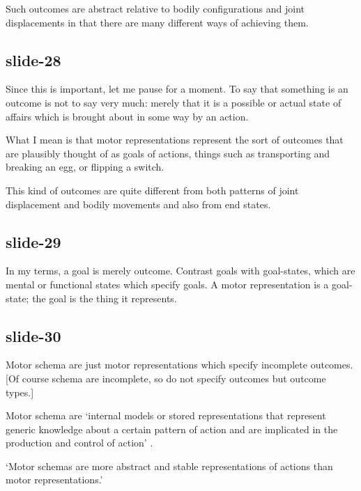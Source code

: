 \documentclass[12pt,\papersize]{extarticle}
\begin{document}
Such outcomes are abstract relative to bodily configurations and joint displacements
in that there are many different ways of achieving them.
 
\subsection{slide-28}
Since this is important, let me pause for a moment.
To say that something is an outcome is not to say very much: merely that it is a
possible or actual state of affairs which is brought about in some way by an action.
 
What I mean is that motor representations represent the sort of outcomes that are plausibly
thought of as goals of actions, things such as transporting and breaking an egg,
or flipping a switch.
 
This kind of outcomes are quite different from both patterns of joint displacement and
bodily movements and also from end states.
 
\subsection{slide-29}
In my terms, a goal is merely outcome.
Contrast goals with goal-states, which are mental or functional states which specify goals.
A motor representation is a goal-state; the goal is the thing it represents.
 
\subsection{slide-30}
Motor schema are just motor representations which specify incomplete outcomes.
[Of course schema are incomplete, so do not specify outcomes but outcome types.]
 
Motor schema are ‘internal models or stored representations that represent generic knowledge about
a certain pattern of action and are implicated in the production and control of action’
\citep{mylopoulos:2016_intentions}.
 
‘Motor schemas are more abstract and stable representations of actions than motor
representations.’
 
\end{document}
